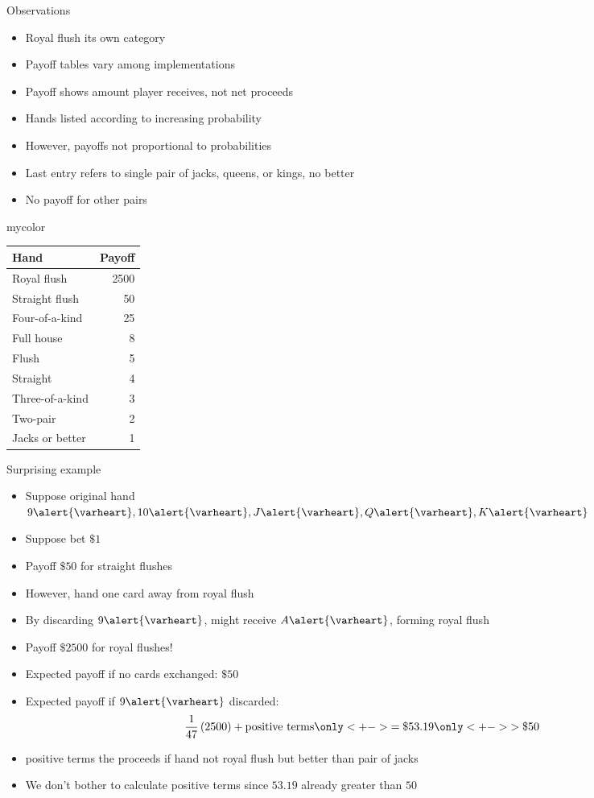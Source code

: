 \documentclass[xcolor=dvipsnames]{beamer}
\theoremstyle{definition}
\newcommand{\hs}{\alert{\varheart}}
\begin{document}
\begin{frame}{Observations}
\begin{multicols}{2}
\begin{itemize}
\item Royal flush its own category
\item Payoff tables vary among implementations
\item Payoff shows amount player receives, not net proceeds
\item Hands listed according to increasing probability
\item However, payoffs not proportional to probabilities
\item Last entry refers to
single pair of jacks, queens, or kings, no better
\item No payoff for other pairs
\end{itemize}
\begin{beamercolorbox}{mycolor}
\begin{tabular}{lr}
Hand&Payoff\\\hline
Royal flush&2500\\
Straight flush&50\\
Four-of-a-kind&25\\
Full house&8\\
Flush&5\\
Straight&4\\
Three-of-a-kind&3\\
Two-pair&2\\
Jacks or better&1
\end{tabular}
\end{beamercolorbox}
\end{multicols}
\end{frame}

\begin{frame}{Surprising example}
\begin{itemize}
\item Suppose original hand $9\hs,10\hs,J\hs,Q\hs,K\hs$
\item Suppose bet $\$1$
\item Payoff $\$50$ for straight flushes
\item However, hand one card away from royal flush
\item By discarding $9\hs$,
might receive $A\hs$, forming royal flush
\item Payoff $\$2500$ for royal flushes!
\item Expected payoff if no cards exchanged: $\$50$
\item Expected payoff if $9\hs$ discarded:
\[\frac{1}{47}\left(2500\right)+\text{positive terms}
\only<+->{=\$53.19}
\only<+->{>\$50}\]
\item \alert{positive terms} the proceeds if
hand not royal flush but better than pair of jacks
\item We don't bother to calculate \alert{positive terms}
since $53.19$ already greater than $50$
\end{itemize}
\end{frame}
\end{document}

